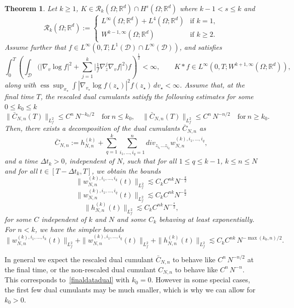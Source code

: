\documentclass[pdflatex,sn-mathphys-num]{sn-jnl}
\theoremstyle{thmstyleone}%
\newtheorem{theorem}{Theorem}
\theoremstyle{thmstyletwo}%
\theoremstyle{thmstylethree}%
\begin{document}
\begin{theorem}\label{thm2}
Let \(k \geq 1\), \( K \in \mathscr{R}_k(\Omega; \mathbb{R}^d)
\cap H^{s}(\Omega; \mathbb{R}^d) \) where \( k - 1 < s \leq k \) and 
\[
\mathscr{R}_k(\Omega; \mathbb{R}^d)
 :=
\begin{cases}
L^{\infty}(\Omega; \mathbb{R}^d) + L^4(\Omega; \mathbb{R}^d) & \text{if } k = 1, \\
W^{k-1,\infty}(\Omega; \mathbb{R}^d) & \text{if } k \geq 2.
\end{cases}
\] 
Assume further that $f \in L^{\infty}(0, T; L^1(\mathcal{D}) \cap L^{\infty}(\mathcal{D}))$, and satisfies
\[
\int_{0}^{T} \left( \int_{\mathcal{D}} \Big( |\nabla_{v} \log f|^{2} + \sum_{j=1}^k \Big| \tfrac{1}{f} \nabla^{j}_{z} \nabla_{v} f \Big|^{2} \Big) f \right)^{\frac{1}{2}} < \infty,
\qquad
K * f \in L^{\infty}\left(0, T; W^{k+1,\infty}(\Omega; \mathbb{R}^d)\right),
\]
along with $\operatorname{ess}\sup_{x_\star} \int |\nabla_{v_\star}\log f(z_\star)|^2 f(z_\star)\,dv_\star < \infty$.
Assume that, at the final time $T$, the rescaled dual cumulants satisfy the following estimates for some $0\leq k_0\leq k$
\begin{equation}
\|\bar C_{N,n}(T)\|_{L^2_f}\leq C^n\,N^{-k_0/2}\quad \mbox{for}\ n\leq k_0,\quad\|\bar C_{N,n}(T)\|_{L^2_f}\leq C^n\,N^{-n/2}\quad \mbox{for}\ n\geq k_0.\label{finaldatadual}
\end{equation}
Then, there exists a decomposition of the dual cumulants \(\bar{C}_{N,n}\) as
\[\bar{C}_{N,n}:=h^{(k)}_{N,n} +\sum_{q=1}^k\sum_{i_1,...,i_q=1}^n div_{z_{i_1}...z_{i_q}} w^{(k),i_1,...,i_q}_{N,n},
\]
and a time $\Delta t_k > 0$, independent of $N$, such that for all \(1 \leq q \leq k-1\), \( k \leq n \leq N \) and for all \(t \in [T-\Delta t_k,T]\), we obtain the bounds
\begin{equation}\label{eq:cumulants_bound0}
 \|w_{N,n}^{(k),i_1,...,i_k}(t) \|_{L^2_f} \lesssim C_k C^{nk} N^{-\frac{k}{2}} 
\end{equation}
%
\begin{equation}\label{eq:cumulants_bound02}
\|w_{N,n}^{(k),i_1,...,i_q}(t) \|_{L^2_f} \lesssim C_k C^{nk} N^{-\frac{k}{2}} 
\end{equation}
%
\begin{equation}\label{eq:cumulants_bound03}
\|h_{N,n}^{(k)}(t) \|_{L^2_f} \lesssim C_k C^{nk} N^{-\frac{s}{2}}, 
\end{equation}
for some $C$ independent of $k$ and $N$ and some ${C}_k$ behaving at least exponentially. For $n<k$, we have the simpler bounds
\begin{equation}
  \|w_{N,n}^{(k),i_1,...,i_k}(t) \|_{L^2_f}+  \|w_{N,n}^{(k),i_1,...,i_q}(t) \|_{L^2_f}+\|h_{N,n}^{(k)}(t) \|_{L^2_f}\lesssim  C_k C^{nk}\,N^{-\max(k_0,n)/2}.\label{eq:cumulants_boundk0}
\end{equation}
\end{theorem}
In general we expect the rescaled dual cumulant $\bar C_{N,n}$ to behave like $C^n\,N^{-n/2}$ at the final time, or the non-rescaled dual cumulant $C_{N,n}$ to behave like $C^n\,N^{-n}$. This corresponds to~\eqref{finaldatadual} with $k_0=0$. However in some special cases, the first few dual cumulants may be much smaller, which is why we can allow for $k_0>0$.
\end{document}
